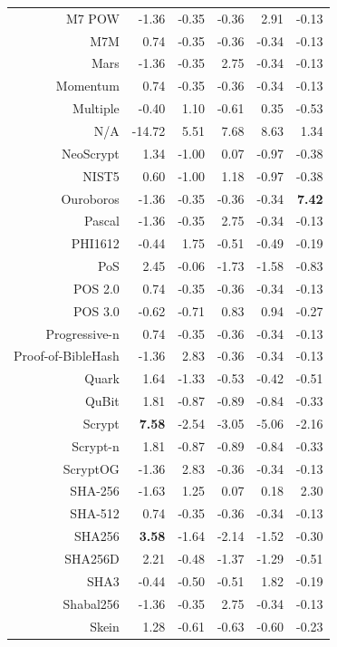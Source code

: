 \documentclass{bmcart}
\begin{document}
\begin{backmatter}
\begin{table}[ht]
\begin{tabular}{rrrrrr}
		M7 POW & -1.36 & -0.35 & -0.36 & 2.91 & -0.13 \\ 
		M7M & 0.74 & -0.35 & -0.36 & -0.34 & -0.13 \\ 
		Mars & -1.36 & -0.35 & 2.75 & -0.34 & -0.13 \\ 
		Momentum & 0.74 & -0.35 & -0.36 & -0.34 & -0.13 \\ 
		Multiple & -0.40 & 1.10 & -0.61 & 0.35 & -0.53 \\ 
		N/A & -14.72 & 5.51 & 7.68 & 8.63 & 1.34 \\ 
		NeoScrypt & 1.34 & -1.00 & 0.07 & -0.97 & -0.38 \\ 
		NIST5 & 0.60 & -1.00 & 1.18 & -0.97 & -0.38 \\ 
		Ouroboros & -1.36 & -0.35 & -0.36 & -0.34 & \textbf{7.42} \\ 
		Pascal & -1.36 & -0.35 & 2.75 & -0.34 & -0.13 \\ 
		PHI1612 & -0.44 & 1.75 & -0.51 & -0.49 & -0.19 \\ 
		PoS & 2.45 & -0.06 & -1.73 & -1.58 & -0.83 \\ 
		POS 2.0 & 0.74 & -0.35 & -0.36 & -0.34 & -0.13 \\ 
		POS 3.0 & -0.62 & -0.71 & 0.83 & 0.94 & -0.27 \\ 
		Progressive-n & 0.74 & -0.35 & -0.36 & -0.34 & -0.13 \\ 
		Proof-of-BibleHash & -1.36 & 2.83 & -0.36 & -0.34 & -0.13 \\ 
		Quark & 1.64 & -1.33 & -0.53 & -0.42 & -0.51 \\ 
		QuBit & 1.81 & -0.87 & -0.89 & -0.84 & -0.33 \\ 
		Scrypt & \textbf{7.58} & -2.54 & -3.05 & -5.06 & -2.16 \\ 
		Scrypt-n & 1.81 & -0.87 & -0.89 & -0.84 & -0.33 \\ 
		ScryptOG & -1.36 & 2.83 & -0.36 & -0.34 & -0.13 \\ 
		SHA-256 & -1.63 & 1.25 & 0.07 & 0.18 & 2.30 \\ 
		SHA-512 & 0.74 & -0.35 & -0.36 & -0.34 & -0.13 \\ 
		SHA256 & \textbf{3.58} & -1.64 & -2.14 & -1.52 & -0.30 \\ 
		SHA256D & 2.21 & -0.48 & -1.37 & -1.29 & -0.51 \\ 
		SHA3 & -0.44 & -0.50 & -0.51 & 1.82 & -0.19 \\ 
		Shabal256 & -1.36 & -0.35 & 2.75 & -0.34 & -0.13 \\ 
		Skein & 1.28 & -0.61 & -0.63 & -0.60 & -0.23 \\ 

\end{tabular}
\end{table}
\end{backmatter}
\end{document}
